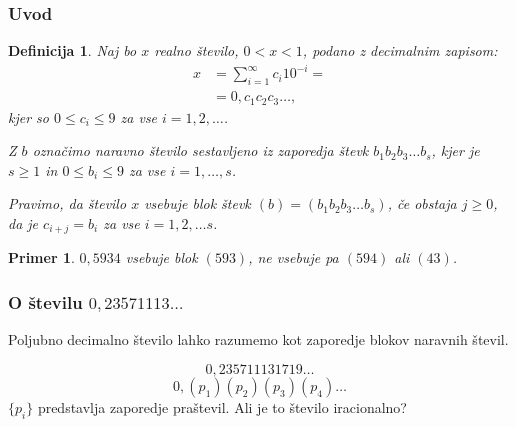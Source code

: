 \documentclass{beamer}
\newtheorem{definicija}{Definicija}
\newtheorem{primer}{Primer}
\begin{document}
\begin{frame}
    \frametitle{Uvod}
    \begin{definicija}
        Naj bo $x$ realno število, $ 0 < x < 1$, podano z decimalnim zapisom: 
        \[ 
            \begin{split}
                x & = \sum^{\infty}_{i=1} c_i 10^{-i} = \\
                & = 0,c_1c_2c_3 \ldots ,
            \end{split}   
        \]
        kjer so $0 \leq c_i \leq 9$ za vse $ i = 1, 2, \ldots$.
        
        Z $b$ označimo naravno število sestavljeno iz zaporedja števk
        $b_1b_2b_3 \ldots b_s$, 
        kjer je $s\geq 1$ in $0 \leq b_i \leq 9$ za vse $i = 1, \ldots, s$.

        Pravimo, da število $x$ \alert{vsebuje blok števk} $(b) = (b_1b_2b_3 \dots b_s)$, če obstaja $j \geq 0$, da je 
        $c_{i+j} = b_i$ za vse $i=1, 2, \ldots s$. 
    \end{definicija}


    \pause
    \begin{primer}
        $0,5934$ vsebuje blok $(593)$, ne vsebuje pa $(594)$ ali $(43)$.
    \end{primer} 


\end{frame}

\begin{frame}
    \frametitle{O številu $0,23571113\ldots$}
    Poljubno decimalno število lahko razumemo kot zaporedje blokov naravnih števil.

    \pause
    \[0,235711131719\ldots\]
    \pause
    \[0,(p_1)(p_2)(p_3)(p_4)\ldots\]
    $\{p_i\}$ predstavlja zaporedje praštevil.
    \pause
    \newline
    \newline
    Ali je to število iracionalno?


\end{frame}
\end{document}
